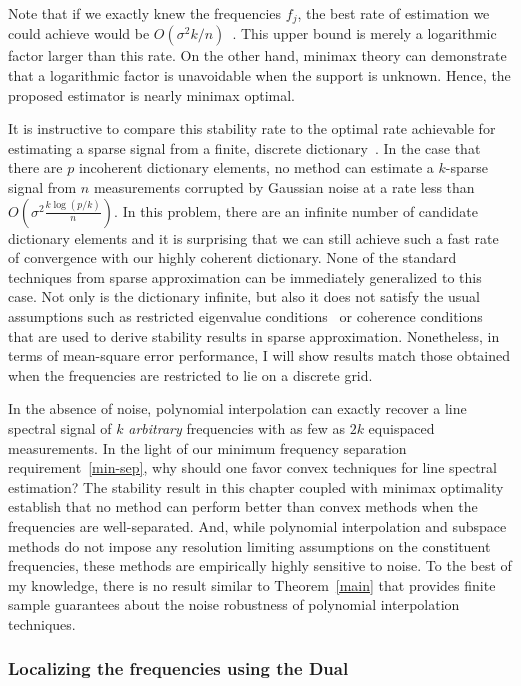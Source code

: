 Note that if we exactly knew the frequencies $f_j$, the best rate of estimation
we could achieve would be $O(\sigma^2 k / n)$~\cite{oracle_lasso}. This upper
bound is merely a logarithmic factor larger than this rate. On the other hand,
minimax theory can demonstrate that a logarithmic factor is unavoidable when the
support is unknown. Hence, the proposed estimator is nearly minimax optimal.

It is instructive to compare this stability rate to the optimal rate achievable
for estimating a sparse signal from a finite, discrete
dictionary~\cite{cd_minimax}. In the case that there are $p$ incoherent
dictionary elements, no method can estimate a $k$-sparse signal from $n$
measurements corrupted by Gaussian noise at a rate less than $O(\sigma^2
\frac{k\log(p/k)}{n})$. In this problem, there are an infinite number of
candidate dictionary elements and it is surprising that we can still achieve
such a fast rate of convergence with our highly coherent dictionary. None of the
standard techniques from sparse approximation can be immediately generalized to
this case. Not only is the dictionary infinite, but also it does not satisfy the
usual assumptions such as restricted eigenvalue conditions~\cite{rest_eig} or
coherence conditions~\cite{coherence} that are used to derive stability results
in sparse approximation. Nonetheless, in terms of mean-square error performance,
I will show results match those obtained when the frequencies are restricted to
lie on a discrete grid.

In the absence of noise, polynomial interpolation can exactly recover a line
spectral signal of $k$ \emph{arbitrary} frequencies with as few as $2 k$
equispaced measurements. In the light of our minimum frequency separation
requirement~\eqref{min-sep}, why should one favor convex techniques for line
spectral estimation? The stability result in this chapter coupled with minimax
optimality establish that no method can perform better than convex methods when
the frequencies are well-separated. And, while polynomial interpolation and
subspace methods do not impose any resolution limiting assumptions on the
constituent frequencies, these methods are empirically highly sensitive to
noise. To the best of my knowledge, there is no result similar to
Theorem~\ref{main} that provides finite sample guarantees about the noise
robustness of polynomial interpolation techniques.


\subsubsection{Localizing the frequencies using the Dual} 

